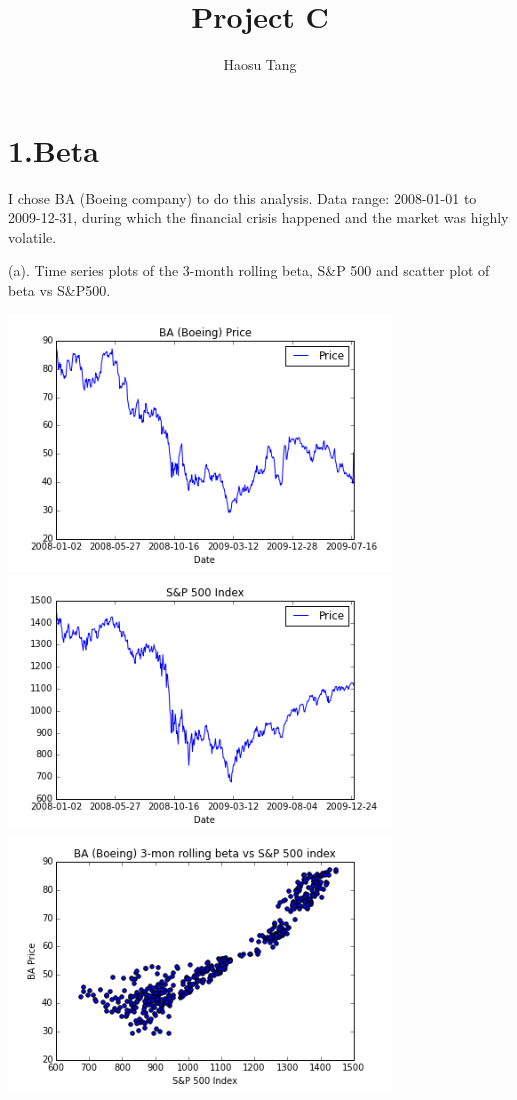 \documentclass[11pt,letter]{article}
\author{Haosu Tang}
\title{Project C}
\begin{document}
\maketitle

\section{1.Beta}
I chose BA (Boeing company) to do this analysis. Data range: 2008-01-01 to 2009-12-31, during which the financial crisis happened and the market was highly volatile.

(a). Time series plots of the 3-month rolling beta, S\&P 500 and scatter plot of beta vs S\&P500.
\begin{center}
\includegraphics[width=4in,keepaspectratio]{1aBA}
\includegraphics[width=4in,keepaspectratio]{1aSP}
\includegraphics[width=4in,keepaspectratio]{1aBASPscatter}
\end{center}
\end{document}
